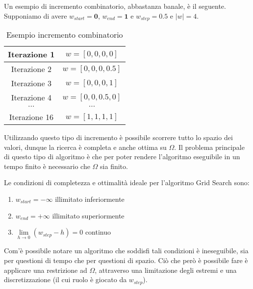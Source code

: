 \begin{esempio}
Un esempio di incremento combinatorio, abbastanza banale, è il seguente.
Supponiamo di avere $w_{start} = \boldsymbol{0}$, $w_{end} = \boldsymbol{1}$
e $w_{step} = 0.5$ e $\left|w\right| = 4$.


\begin{table}[h]
	\centering
	\begin{tabular}{|c|c|}
		\hline
		Iterazione 1 & $w = \left[0, 0, 0, 0\right]$ \\
		\hline
		Iterazione 2 & $w = \left[0, 0, 0, 0.5\right]$ \\
		\hline
		Iterazione 3 & $w = \left[0, 0, 0, 1\right]$ \\
		\hline
		Iterazione 4 & $w = \left[0, 0, 0.5, 0\right]$ \\
		\hline
		$\cdots$ & $\cdots$ \\
		\hline
		Iterazione 16 & $w = \left[1,1,1,1\right]$ \\
		\hline
	\end{tabular}
	\caption{Esempio incremento combinatorio}
\end{table}
\end{esempio}

Utilizzando questo tipo di incremento è possibile scorrere
tutto lo spazio dei valori, dunque la ricerca è completa e anche ottima
su $\Omega$.
Il problema principale di questo tipo di algoritmo è che
per poter rendere l'algoritmo eseguibile in un tempo finito
è necessario che $\Omega$ sia finito.

\begin{definizione}
	Le condizioni di completezza e ottimalità ideale per l'algoritmo Grid Search sono:
	\begin{enumerate}
		\item $w_{start} = \boldsymbol{-\infty}$ illimitato inferiormente
		\item $w_{end} = \boldsymbol{+\infty}$ illimitato superiormente
		\item $\lim\limits_{h \to 0} \left(w_{step} - h\right) = 0$ continuo
	\end{enumerate}
\end{definizione}

Com'è possibile notare un algoritmo che soddisfi tali condizioni è
ineseguibile, sia per questioni di tempo che per questioni di spazio.
Ciò che però è possibile fare è applicare una restrizione ad $\Omega$, attraverso
una limitazione degli estremi e una discretizzazione (il cui ruolo è giocato da $w_{step}$).

